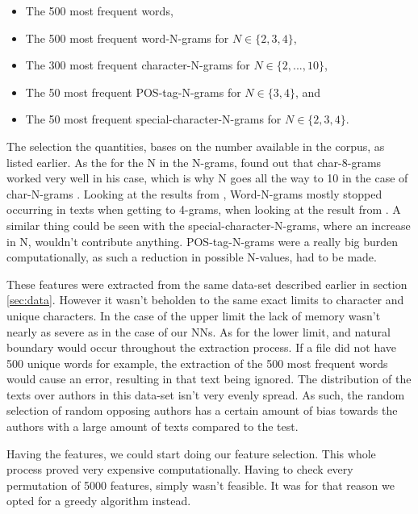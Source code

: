 \begin{itemize}
    \item The 500 most frequent words,
    \item The 500 most frequent word-N-grams for $N \in \{2,3,4\}$,
    \item The 300 most frequent character-N-grams for $N \in \{2,...,10\}$,
    \item The 50 most frequent \gls{POS}-tag-N-grams for $N \in \{3,4\}$, and
    \item The 50 most frequent special-character-N-grams for $N \in \{2,3,4\}$.
\end{itemize}

The selection the quantities, bases on the number available in the corpus,
as listed earlier. As the for the N in the N-grams, \cite{aalykke2016} found
out that char-8-grams worked very well in his case, which is why N goes all
the way to 10 in the case of char-N-grams . Looking at the results
from \cite{US}, Word-N-grams mostly stopped occurring in texts when getting
to 4-grams, when looking at the result from \cite{US}. A similar thing
could be seen with the special-character-N-grams, where an increase in N,
wouldn't contribute anything. \gls{POS}-tag-N-grams were a really big burden
computationally, as such a reduction in possible N-values, had to be made.

These features were extracted from the same data-set described earlier in
section \ref{sec:data}. However it wasn't beholden to the same exact limits to
character and unique characters. In the case of the upper limit the lack of
memory wasn't nearly as severe as in the case of our \gls{NN}s. As for the lower
limit, and natural boundary would occur throughout the extraction process.
If a file did not have 500 unique words for example, the extraction
of the 500 most frequent words would cause an error, resulting in that
text being ignored.
The distribution of the texts over authors in this data-set isn't
very evenly spread. As such, the random selection of random opposing
authors has a certain amount of bias towards the authors with a large
amount of texts compared to the test.

Having the features, we could start doing our feature selection. This whole
process proved very expensive computationally. Having to check every permutation
of 5000 features, simply wasn't feasible. It was for that reason we opted for
a greedy algorithm instead.

